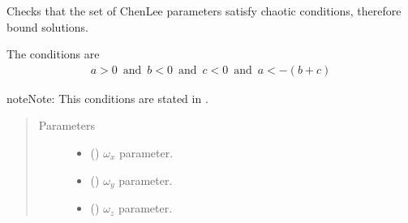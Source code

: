 \documentclass[a4paper,landscape,10pt,english]{sphinxmanual}
\begin{document}
\begin{fulllineitems}
\label{\detokenize{code_docs/simulation_API.controller:simulation_API.controller.tasks._check_chen_lee_params}}
Checks that the set of Chen\sphinxhyphen{}Lee parameters satisfy chaotic conditions,
therefore bound solutions.

The conditions are
\begin{equation*}
\begin{split}a > 0 \,\text{ and }\, b < 0 \,\text{ and }\, c < 0 \,\text{ and }\, a < - (b + c)\end{split}
\end{equation*}
\begin{sphinxadmonition}{note}{Note:}
This conditions are stated in .
\end{sphinxadmonition}
\begin{quote}\begin{description}
\item[{Parameters}] \leavevmode\begin{itemize}
\item {} 
 () \textendash{} \(\omega_x\) parameter.

\item {} 
 () \textendash{} \(\omega_y\) parameter.

\item {} 
 () \textendash{} \(\omega_z\) parameter.

\end{itemize}

\end{description}\end{quote}

\end{fulllineitems}

\end{document}
